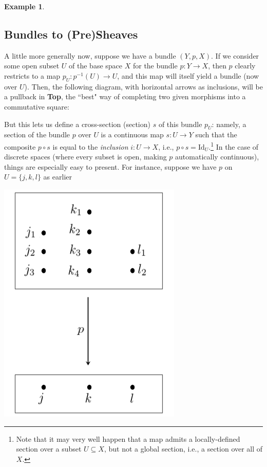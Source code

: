 \documentclass[11pt]{book}
\theoremstyle{definition}
\newtheorem{example}{Example}[section]
\theoremstyle{definition}
\theoremstyle{definition}
\theoremstyle{theorem}
\theoremstyle{definition}
\begin{document}
\begin{example}
\subsection{Bundles to (Pre)Sheaves}
A little more generally now, suppose we have a bundle $(Y, p, X)$. If we consider some open subset $U$ of the base space $X$ for the bundle $p: Y \rightarrow X$, then $p$ clearly restricts to a map $p_U: p^{-1}(U) \rightarrow U$, and this map will itself yield a bundle (now over $U$). Then, the following diagram, with horizontal arrows as inclusions, will be a pullback in \textbf{Top}, the ``best" way of completing two given morphisms into a commutative square:  
	\begin{center} 
	\end{center} 
But this lets us define a cross-section (section) $s$ of this bundle $p_U$: namely, a section of the bundle $p$ over $U$ is a continuous map $s: U \rightarrow Y$ such that the composite $p \circ s$ is equal to the \textit{inclusion} $i: U \rightarrow X$, i.e., $p \circ s = \text{Id}_U$.\footnote{Note that it may very well happen that a map admits a locally-defined section over a subset $U \subseteq X$, but not a global section, i.e., a section over all of $X$.}
In the case of discrete spaces (where every subset is open, making $p$ automatically continuous), things are especially easy to present. For instance, suppose we have $p$ on $U = \{j,k,l\}$ as earlier 
\begin{center}
	\includegraphics*[scale=0.27]{FiberThingy.png}

\end{center}
\end{example}
\end{document}
